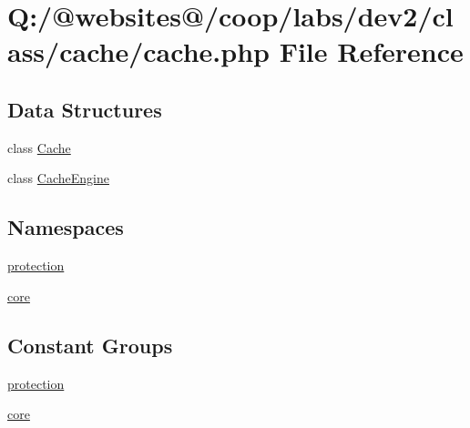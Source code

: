 \hypertarget{cache_8php}{\section{Q\-:/@websites@/coop/labs/dev2/class/cache/cache.php File Reference}
\label{cache_8php}
}
\subsection*{Data Structures}
\begin{DoxyCompactItemize}
\item 
class \hyperlink{class_cache}{Cache}
\item 
class \hyperlink{class_cache_engine}{Cache\-Engine}
\end{DoxyCompactItemize}
\subsection*{Namespaces}
\begin{DoxyCompactItemize}
\item 
\hyperlink{namespaceprotection}{protection}
\item 
\hyperlink{namespacecore}{core}
\end{DoxyCompactItemize}
\subsection*{Constant Groups}
\begin{DoxyCompactItemize}
\item 
\hyperlink{namespaceprotection}{protection}
\item 
\hyperlink{namespacecore}{core}
\end{DoxyCompactItemize}
